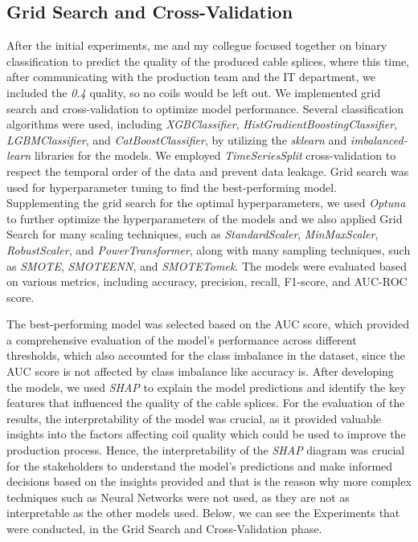 \subsection{Grid Search and Cross-Validation}

After the initial experiments, me and my collegue focused together on binary
classification to predict the quality of the produced cable splices, where this
time, after communicating with the production team and the IT department, we
included the \emph{0.4} quality, so no coils would be left out. We implemented
grid search and cross-validation to optimize model performance. Several
classification algorithms were used, including \emph{XGBClassifier},
\emph{HistGradientBoostingClassifier}, \emph{LGBMClassifier}, and
\emph{CatBoostClassifier}, by utilizing the \emph{sklearn} and
\emph{imbalanced-learn} libraries for the models. We employed
\emph{TimeSeriesSplit} cross-validation to respect the temporal order of the
data and prevent data leakage. Grid search was used for hyperparameter tuning
to find the best-performing model. Supplementing the grid search for the
optimal hyperparameters, we used \emph{Optuna} to further optimize the
hyperparameters of the models and we also applied Grid Search for many scaling
techniques, such as \emph{StandardScaler}, \emph{MinMaxScaler},
\emph{RobustScaler}, and \emph{PowerTransformer}, along with many sampling
techniques, such as \emph{SMOTE}, \emph{SMOTEENN}, and \emph{SMOTETomek}. The
models were evaluated based on various metrics, including accuracy, precision,
recall, F1-score, and AUC-ROC score.

The best-performing model was selected based on the AUC score, which provided a
comprehensive evaluation of the model's performance across different
thresholds, which also accounted for the class imbalance in the dataset, since
the AUC score is not affected by class imbalance like accuracy is. After
developing the models, we used \emph{SHAP} to explain the model predictions and
identify the key features that influenced the quality of the cable splices. For
the evaluation of the results, the interpretability of the model was crucial,
as it provided valuable insights into the factors affecting coil quality which
could be used to improve the production process. Hence, the interpretability of
the \emph{SHAP} diagram was crucial for the stakeholders to understand the
model's predictions and make informed decisions based on the insights provided
and that is the reason why more complex techniques such as Neural Networks were
not used, as they are not as interpretable as the other models used. Below, we
can see the Experiments that were conducted, in the Grid Search and
Cross-Validation phase. 

